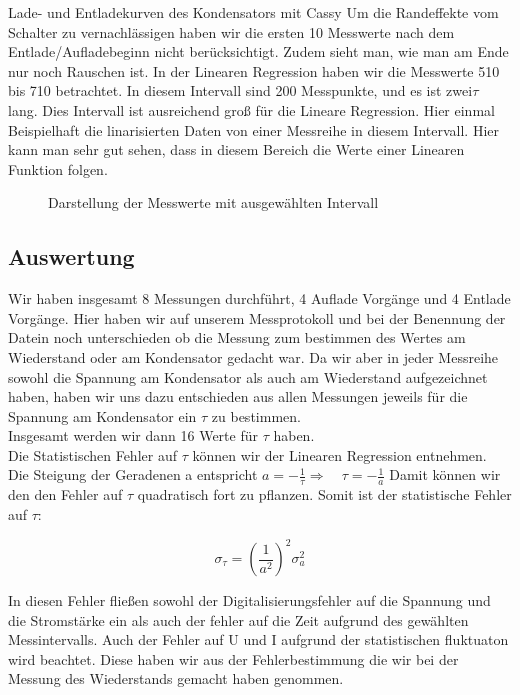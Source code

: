 \documentclass[twoside]{protokoll}
\begin{document}
\begin{aufgabe}{Lade- und Entladekurven des Kondensators mit Cassy}
Um die Randeffekte vom Schalter zu vernachlässigen haben wir die ersten 10 Messwerte nach dem Entlade/Aufladebeginn nicht berücksichtigt.
Zudem sieht man, wie man am Ende nur noch Rauschen ist. In der Linearen Regression haben wir die Messwerte 510 bis 710 betrachtet.
In diesem Intervall sind 200 Messpunkte, und es ist zwei$\tau$ lang. Dies Intervall ist ausreichend groß für die Lineare Regression.  
Hier einmal Beispielhaft die linarisierten Daten von einer Messreihe in diesem Intervall.
Hier kann man sehr gut sehen, dass in diesem Bereich die Werte einer Linearen Funktion folgen.

\begin{figure}[H]
    \centering
    \hfill
    \caption{Darstellung der Messwerte mit ausgewählten Intervall}
    \centering
\end{figure}
 
\subsection{Auswertung}
Wir haben insgesamt 8 Messungen durchführt, 4 Auflade Vorgänge und 4 Entlade Vorgänge.
Hier haben wir auf unserem Messprotokoll und bei der Benennung der Datein noch unterschieden ob die Messung zum bestimmen des Wertes am Wiederstand oder am Kondensator gedacht war.
Da wir aber in jeder Messreihe sowohl die Spannung am Kondensator als auch am Wiederstand aufgezeichnet haben, haben wir uns dazu entschieden aus allen Messungen jeweils für die Spannung am Kondensator ein $\tau$
zu bestimmen.\\ 
Insgesamt werden wir dann 16 Werte für $\tau$  haben.\\

Die Statistischen Fehler auf $\tau$ können wir der Linearen Regression entnehmen. 
Die Steigung der Geradenen a entspricht  $ a = -\frac{1}{\tau} \Rightarrow \quad \tau = - \frac{1}{a}$  Damit können wir den den Fehler auf $\tau$ quadratisch fort zu pflanzen. Somit ist der statistische Fehler auf $\tau$:

\begin{equation}
	\sigma_{\tau} = \left(\frac{1}{a^2}\right)^2 \sigma_a^2
 \end{equation}
 
In diesen Fehler fließen sowohl der Digitalisierungsfehler auf die Spannung und die Stromstärke ein als auch der fehler auf die Zeit aufgrund des gewählten Messintervalls.
Auch der Fehler auf U und I aufgrund der statistischen fluktuaton wird beachtet. 
Diese haben wir aus der Fehlerbestimmung die wir bei der Messung des Wiederstands gemacht haben genommen.\\


\end{aufgabe}
\end{document}

